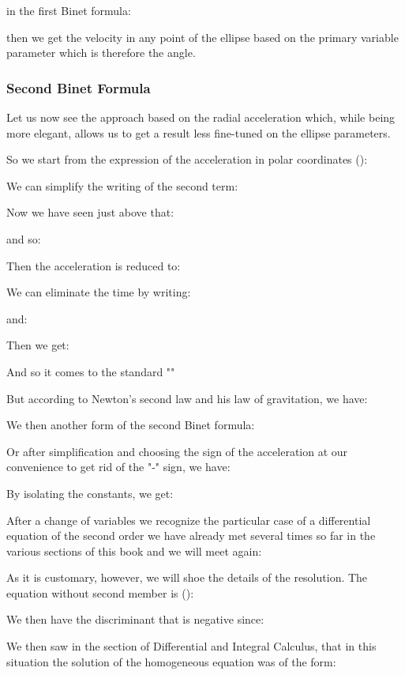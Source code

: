 	in the first Binet formula:
	
	then we get the velocity in any point of the ellipse based on the primary variable parameter which is therefore the angle.
	
	\subsubsection{Second Binet Formula}
	Let us now see the approach based on the radial acceleration which, while being more elegant, allows us to get a result less fine-tuned on the ellipse parameters.

	So we start from the expression of the acceleration in polar coordinates ():
	
	We can simplify the writing of the second term:
	
	Now we have seen just above that:
	
	and so:
	
	Then the acceleration is reduced to:
	
	We can eliminate the time by writing:
	
	and:
	
	Then we get:
	
	And so it comes to the standard ""
	
	But according to Newton's second law and his law of gravitation, we have:
		
	We then another form of the second Binet formula:
	
	Or after simplification and choosing the sign of the acceleration at our convenience to get rid of the "-" sign, we have:
	
	By isolating the constants, we get:
	
	After a change of variables we recognize the particular case of a differential equation of the second order we have already met several times so far in the various sections of this book and we will meet again:
	
	As it is customary, however, we will shoe the details of the resolution. The equation without second member is ():
	
	We then have the discriminant that is negative since:
	
	We then saw in the section of Differential and Integral Calculus, that in this situation the solution of the homogeneous equation was of the form:
	
